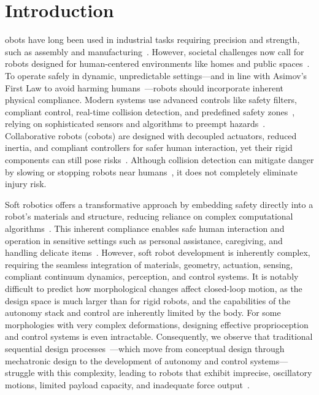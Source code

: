 \section{Introduction}
obots have long been used in industrial tasks requiring precision and strength, such as assembly and manufacturing~\citep{todd1996fundamentals}. However, societal challenges now call for robots designed for human-centered environments like homes and public spaces~\citep{nahavandi2019industry, chibani2013ubiquitous, royakkers2015literature}. To operate safely in dynamic, unpredictable settings—and in line with Asimov’s First Law to avoid harming humans~\citep{asimov1941three, villani2018survey}—robots should incorporate inherent physical compliance. Modern systems use advanced controls like safety filters, compliant control, real-time collision detection, and predefined safety zones~\citep{zhao2024potential}, relying on sophisticated sensors and algorithms to preempt hazards~\citep{fragapane2021planning}. Collaborative robots (cobots) are designed with decoupled actuators, reduced inertia, and compliant controllers for safer human interaction, yet their rigid components can still pose risks~\citep{haddadin2009requirements}. Although collision detection can mitigate danger by slowing or stopping robots near humans~\citep{haddadin2013towards}, it does not completely eliminate injury risk.

Soft robotics offers a transformative approach by embedding safety directly into a robot’s materials and structure, reducing reliance on complex computational algorithms~\citep{rus2015design, laschi2016soft}. This inherent compliance enables safe human interaction and operation in sensitive settings such as personal assistance, caregiving, and handling delicate items~\citep{abidi2017intrinsic, pasquier2025study}. However, soft robot development is inherently complex, requiring the seamless integration of materials, geometry, actuation, sensing, compliant continuum dynamics, perception, and control systems. It is notably difficult to predict how morphological changes affect closed-loop motion, as the design space is much larger than for rigid robots, and the capabilities of the autonomy stack and control are inherently limited by the body. For some morphologies with very complex deformations, designing effective proprioception and control systems is even intractable. Consequently, we observe that traditional sequential design processes~\citep{van2020delft}—which move from conceptual design through mechatronic design to the development of autonomy and control systems—struggle with this complexity, leading to robots that exhibit imprecise, oscillatory motions, limited payload capacity, and inadequate force output~\citep{iida2011soft, cianchetti2013stiff, mazzolai2022roadmap, majidi2014soft, hawkes2017soft}.

